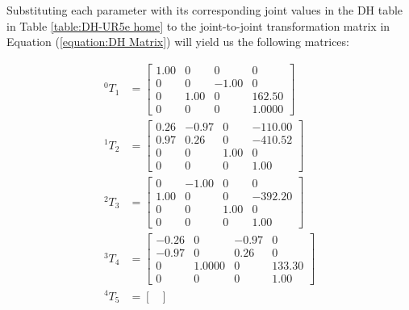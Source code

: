 Substituting each parameter with its corresponding joint values in the DH table in Table \ref{table:DH-UR5e home} to the joint-to-joint transformation matrix in Equation (\ref{equation:DH Matrix}) will yield us the following matrices:

\begin{equation*}
    \begin{split}
        ^{0}T_{1} & = \begin{bmatrix}
                          1.00 & 0    & 0     & 0      \\
                          0    & 0    & -1.00 & 0      \\
                          0    & 1.00 & 0     & 162.50 \\
                          0    & 0    & 0     & 1.0000
                      \end{bmatrix}    \\
        ^{1}T_{2} & = \begin{bmatrix}
                          0.26 & -0.97 & 0    & -110.00 \\
                          0.97 & 0.26  & 0    & -410.52 \\
                          0    & 0     & 1.00 & 0       \\
                          0    & 0     & 0    & 1.00
                      \end{bmatrix}   \\
        ^{2}T_{3} & = \begin{bmatrix}
                          0    & -1.00 & 0    & 0       \\
                          1.00 & 0     & 0    & -392.20 \\
                          0    & 0     & 1.00 & 0       \\
                          0    & 0     & 0    & 1.00
                      \end{bmatrix}   \\
        ^{3}T_{4} & = \begin{bmatrix}
                          -0.26 & 0      & -0.97 & 0      \\
                          -0.97 & 0      & 0.26  & 0      \\
                          0     & 1.0000 & 0     & 133.30 \\
                          0     & 0      & 0     & 1.00
                      \end{bmatrix} \\
        ^{4}T_{5} & = \begin{bmatrix}

\end{bmatrix}
\end{split}
\end{equation*}
